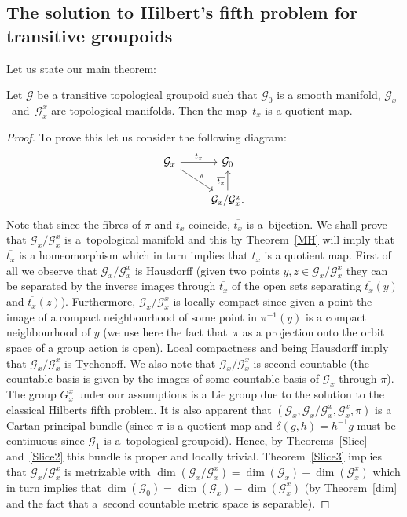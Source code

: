 \subsection{The solution to Hilbert's fifth problem for transitive groupoids}
Let us state our main theorem:
\begin{tw} Let $\mathcal{G}$ be a transitive topological groupoid such that $\mathcal{G}_0$ is a smooth manifold, $\mathcal{G}_x$~and~$\mathcal{G}^x_x$ are topological manifolds. Then the map~$t_x$ is a quotient map.
\end{tw}
\begin{proof} To prove this let us consider the following diagram:
\begin{equation*}
\begin{tikzcd}
\mathcal{G}_x \arrow[rd, "\pi"] \arrow[r, "t_x"] & \mathcal{G}_0 \\
& \mathcal{G}_x\slash\mathcal{G}^x_x.\arrow[u, "\overline{t_x}"]
\end{tikzcd}
\end{equation*}
Note that since the fibres of $\pi$ and $t_x$ coincide, $\overline{t_x}$ is a~bijection. We shall prove that $\mathcal{G}_x\slash\mathcal{G}_x^x$ is a~topological manifold and this by Theorem~\ref{MH} will imply that $\overline{t_x}$ is a homeomorphism which in turn implies that $t_x$ is a quotient map. First of all we observe that $\mathcal{G}_x\slash\mathcal{G}_x^x$ is Hausdorff (given two points $y,z\in\mathcal{G}_x\slash\mathcal{G}_x^x$ they can be separated by the inverse images through $\overline{t_x}$ of the open sets separating $\overline{t_x}(y)$ and $\overline{t_x}(z)$). Furthermore, $\mathcal{G}_x\slash\mathcal{G}_x^x$ is locally compact since given a point  the image of a compact neighbourhood of some point in $\pi^{-1}(y)$ is a compact neighbourhood of $y$ (we use here the fact that~$\pi$ as a projection onto the orbit space of a group action is open). Local compactness and being Hausdorff imply that $\mathcal{G}_x\slash\mathcal{G}_x^x$ is Tychonoff. We also note that $\mathcal{G}_x\slash\mathcal{G}_x^x$ is second countable (the countable basis is given by the images of some countable basis of $\mathcal{G}_x$ through $\pi$). The group $G^x_x$ under our assumptions is a Lie group due to the solution to the classical Hilberts fifth problem. It is also apparent that $(\mathcal{G}_x,\mathcal{G}_x\slash\mathcal{G}_x^x,\mathcal{G}_x^x,\pi)$ is a Cartan principal bundle (since $\pi$ is a quotient map and $\delta(g,h)=h^{-1}g$ must be continuous since $\mathcal{G}_1$ is a~topological groupoid). Hence, by Theorems~\ref{Slice} and~\ref{Slice2} this bundle is proper and locally trivial. Theorem~\ref{Slice3} implies that $\mathcal{G}_x\slash\mathcal{G}_x^x$ is metrizable with $\dim(\mathcal{G}_x\slash\mathcal{G}_x^x)=\dim(\mathcal{G}_x)-\dim(\mathcal{G}_x^x)$ which in turn implies that $\dim(\mathcal{G}_0)= \dim(\mathcal{G}_x)-\dim(\mathcal{G}_x^x)$ (by Theorem~\ref{dim} and the fact that a~second countable metric space is separable).


\end{proof}
